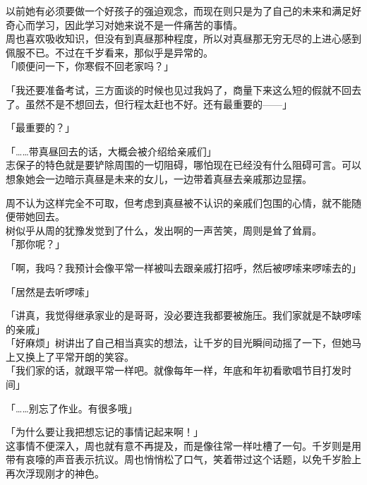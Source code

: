 以前她有必须要做一个好孩子的强迫观念，而现在则只是为了自己的未来和满足好奇心而学习，因此学习对她来说不是一件痛苦的事情。\\

周也喜欢吸收知识，但没有到真昼那种程度，所以对真昼那无穷无尽的上进心感到佩服不已。不过在千岁看来，那似乎是异常的。\\

「顺便问一下，你寒假不回老家吗？」

「我还要准备考试，三方面谈的时候也见过我妈了，商量下来这么短的假就不回去了。虽然不是不想回去，但行程太赶也不好。还有最重要的——」

「最重要的？」

「……带真昼回去的话，大概会被介绍给亲戚们」\\

志保子的特色就是要铲除周围的一切阻碍，哪怕现在已经没有什么阻碍可言。可以想象她会一边暗示真昼是未来的女儿，一边带着真昼去亲戚那边显摆。

周不认为这样完全不可取，但考虑到真昼被不认识的亲戚们包围的心情，就不能随便带她回去。\\

树似乎从周的犹豫发觉到了什么，发出啊的一声苦笑，周则是耸了耸肩。\\

「那你呢？」

「啊，我吗？我预计会像平常一样被叫去跟亲戚打招呼，然后被啰嗦来啰嗦去的」

「居然是去听啰嗦」

「讲真，我觉得继承家业的是哥哥，没必要连我都要被施压。我们家就是不缺啰嗦的亲戚」\\

「好麻烦」树讲出了自己相当真实的想法，让千岁的目光瞬间动摇了一下，但她马上又换上了平常开朗的笑容。\\

「我们家的话，就跟平常一样吧。就像每年一样，年底和年初看歌唱节目打发时间」

「……别忘了作业。有很多哦」

「为什么要让我把想忘记的事情记起来啊！」\\

这事情不便深入，周也就有意不再提及，而是像往常一样吐槽了一句。千岁则是用带有哀嚎的声音表示抗议。周也悄悄松了口气，笑着带过这个话题，以免千岁脸上再次浮现刚才的神色。\\
